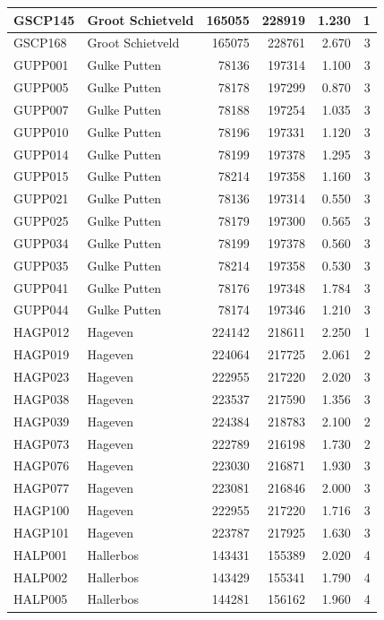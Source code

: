 \documentclass[11pt,]{book}
\begin{document}
\begin{table}
\begin{tabular}[t]{l|l|r|r|r|r}
\hline
GSCP145 & Groot Schietveld & 165055 & 228919 & 1.230 & 1\\
\hline
GSCP168 & Groot Schietveld & 165075 & 228761 & 2.670 & 3\\
\hline
GUPP001 & Gulke Putten & 78136 & 197314 & 1.100 & 3\\
\hline
GUPP005 & Gulke Putten & 78178 & 197299 & 0.870 & 3\\
\hline
GUPP007 & Gulke Putten & 78188 & 197254 & 1.035 & 3\\
\hline
GUPP010 & Gulke Putten & 78196 & 197331 & 1.120 & 3\\
\hline
GUPP014 & Gulke Putten & 78199 & 197378 & 1.295 & 3\\
\hline
GUPP015 & Gulke Putten & 78214 & 197358 & 1.160 & 3\\
\hline
GUPP021 & Gulke Putten & 78136 & 197314 & 0.550 & 3\\
\hline
GUPP025 & Gulke Putten & 78179 & 197300 & 0.565 & 3\\
\hline
GUPP034 & Gulke Putten & 78199 & 197378 & 0.560 & 3\\
\hline
GUPP035 & Gulke Putten & 78214 & 197358 & 0.530 & 3\\
\hline
GUPP041 & Gulke Putten & 78176 & 197348 & 1.784 & 3\\
\hline
GUPP044 & Gulke Putten & 78174 & 197346 & 1.210 & 3\\
\hline
HAGP012 & Hageven & 224142 & 218611 & 2.250 & 1\\
\hline
HAGP019 & Hageven & 224064 & 217725 & 2.061 & 2\\
\hline
HAGP023 & Hageven & 222955 & 217220 & 2.020 & 3\\
\hline
HAGP038 & Hageven & 223537 & 217590 & 1.356 & 3\\
\hline
HAGP039 & Hageven & 224384 & 218783 & 2.100 & 2\\
\hline
HAGP073 & Hageven & 222789 & 216198 & 1.730 & 2\\
\hline
HAGP076 & Hageven & 223030 & 216871 & 1.930 & 3\\
\hline
HAGP077 & Hageven & 223081 & 216846 & 2.000 & 3\\
\hline
HAGP100 & Hageven & 222955 & 217220 & 1.716 & 3\\
\hline
HAGP101 & Hageven & 223787 & 217925 & 1.630 & 3\\
\hline
HALP001 & Hallerbos & 143431 & 155389 & 2.020 & 4\\
\hline
HALP002 & Hallerbos & 143429 & 155341 & 1.790 & 4\\
\hline
HALP005 & Hallerbos & 144281 & 156162 & 1.960 & 4\\

\end{tabular}
\end{table}
\end{document}

